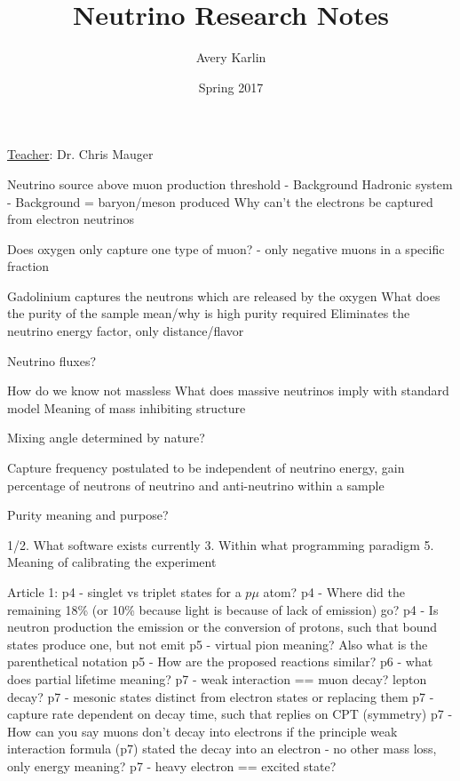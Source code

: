 \documentclass[11 pt, twoside]{article}
\begin{document}
\title{Neutrino Research Notes}
\author{Avery Karlin}
\date{Spring 2017}
\newcommand{\teacher}{Dr. Chris Mauger}

\maketitle
\newpage
\hypertarget{content}{\tableofcontents}
\vspace{11pt}
\noindent
\underline{Teacher}: \teacher
\newpage

Neutrino source above muon production threshold - Background
Hadronic system - Background = baryon/meson produced
Why can't the electrons be captured from electron neutrinos

Does oxygen only capture one type of muon? - only negative muons in a specific fraction

Gadolinium captures the neutrons which are released by the oxygen
What does the purity of the sample mean/why is high purity required
Eliminates the neutrino energy factor, only distance/flavor

Neutrino fluxes?

How do we know not massless
What does massive neutrinos imply with standard model
Meaning of mass inhibiting structure

Mixing angle determined by nature?

Capture frequency postulated to be independent of neutrino energy, gain percentage of neutrons of neutrino and anti-neutrino within a sample

Purity meaning and purpose?

1/2. What software exists currently
3. Within what programming paradigm
5. Meaning of calibrating the experiment

Article 1:
p4 - singlet vs triplet states for a $p\mu$ atom?
p4 - Where did the remaining 18\% (or 10\% because light is because of lack of emission) go?
p4 - Is neutron production the emission or the conversion of protons, such that bound states produce one, but not emit
p5 - virtual pion meaning? Also what is the parenthetical notation
p5 - How are the proposed reactions similar?
p6 - what does partial lifetime meaning?
p7 - weak interaction == muon decay? lepton decay?
p7 - mesonic states distinct from electron states or replacing them
p7 - capture rate dependent on decay time, such that replies on CPT (symmetry)
p7 - How can you say muons don't decay into electrons if the principle weak interaction formula (p7) stated the decay into an electron - no other mass loss, only energy meaning?
p7 - heavy electron == excited state?
\end{document}
